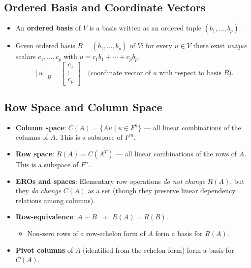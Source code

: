 \documentclass[hidelinks]{article}
\begin{document}
\subsection{Ordered Basis and Coordinate Vectors}
\begin{itemize}
    \item An \textbf{ordered basis} of $V$ is a basis written as an ordered tuple $(b_1,\ldots,b_p)$.
    \item Given ordered basis $B = (b_1, \ldots, b_p)$ of $V$: for every $u \in V$ there exist \emph{unique} scalars $c_1, \ldots, c_p$ with $u = c_1 b_1 + \cdots + c_p b_p$.
    \[
        [u]_B = \begin{bmatrix}c_1\\ \vdots \\ c_p\end{bmatrix} \quad\text{(coordinate vector of $u$ with respect to basis $B$)}.
    \]
\end{itemize}

\subsection{Row Space and Column Space}
\begin{itemize}
    \item \textbf{Column space}: $C(A) = \{Au \mid u \in F^n\}$ — all linear combinations of the columns of $A$. This is a subspace of $F^m$.
    \item \textbf{Row space}: $R(A) = C(A^T)$ — all linear combinations of the rows of $A$. This is a subspace of $F^n$.
    \item \textbf{EROs and spaces}: Elementary row operations \emph{do not change} $R(A)$, but they \emph{do change} $C(A)$ as a set (though they preserve linear dependency relations among columns).
    \item \textbf{Row-equivalence}: $A \sim B$ $\Longrightarrow$ $R(A) = R(B)$.
    \begin{itemize}
        \item Non-zero rows of a row-echelon form of $A$ form a basis for $R(A)$.
    \end{itemize}
    \item \textbf{Pivot columns} of $A$ (identified from the echelon form) form a basis for $C(A)$.
\end{itemize}
\end{document}
